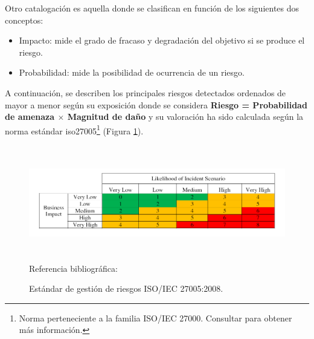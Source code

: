 \documentclass[12pt,a4paper, twoside]{report}
\begin{document}
	Otro catalogación es aquella donde se clasifican en función de los siguientes dos conceptos:
	
	\begin{itemize}
		\item Impacto: mide el grado de fracaso y degradación del objetivo si se produce el riesgo.
		\item Probabilidad: mide la posibilidad de ocurrencia de un riesgo.
	\end{itemize}
		
	A continuación, se describen los principales riesgos detectados ordenados de mayor a menor según su exposición donde se considera \textbf{Riesgo = Probabilidad de amenaza $\times$ Magnitud de daño} y su valoración ha sido calculada según la norma estándar \gls{iso27005}\footnote{Norma perteneciente a la familia ISO/IEC 27000. Consultar \cite{iso2013} para obtener más información.} (Figura \ref{fig:planning-risk-standard}).
	
	\begin{figure}[!ht]   
		\caption{Estándar de gestión de riesgos ISO/IEC 27005:2008.} 
		\begin{center} 
	 		\includegraphics[width=16cm,height=5cm]{Images/planning/ISO7005} \\
			\label{fig:planning-risk-standard} 
			Referencia bibliográfica: \cite{risk:MMPQRM}
		\end{center}  
	\end{figure}  
					
	\newpage
					
\end{document}
